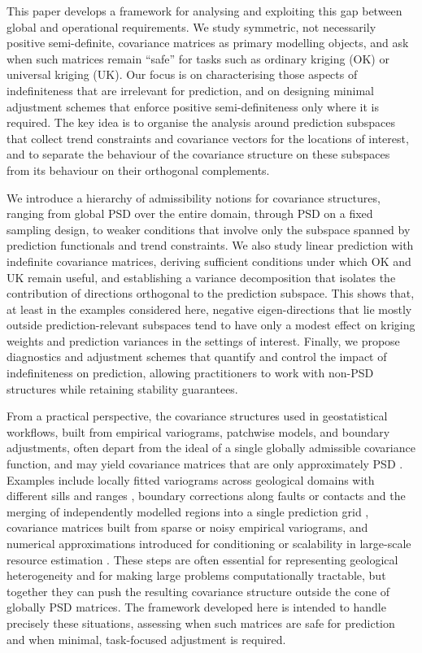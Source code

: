 \documentclass[smallextended]{svjour3}
\newcommand{\1}{\mathbf{1}}
\begin{document}
This paper develops a framework for analysing and exploiting this gap between global and operational requirements. We study symmetric, not necessarily positive semi-definite, covariance matrices as primary modelling objects, and ask when such matrices remain ``safe'' for tasks such as ordinary kriging (OK) or universal kriging (UK). Our focus is on characterising those aspects of indefiniteness that are irrelevant for prediction, and on designing minimal adjustment schemes that enforce positive semi-definiteness only where it is required. The key idea is to organise the analysis around prediction subspaces that collect trend constraints and covariance vectors for the locations of interest, and to separate the behaviour of the covariance structure on these subspaces from its behaviour on their orthogonal complements.

We introduce a hierarchy of admissibility notions for covariance structures, ranging from global PSD over the entire domain, through PSD on a fixed sampling design, to weaker conditions that involve only the subspace spanned by prediction functionals and trend constraints. We also study linear prediction with indefinite covariance matrices, deriving sufficient conditions under which OK and UK remain useful, and establishing a variance decomposition that isolates the contribution of directions orthogonal to the prediction subspace. This shows that, at least in the examples considered here, negative eigen-directions that lie mostly outside prediction-relevant subspaces tend to have only a modest effect on kriging weights and prediction variances in the settings of interest. Finally, we propose diagnostics and adjustment schemes that quantify and control the impact of indefiniteness on prediction, allowing practitioners to work with non-PSD structures while retaining stability guarantees.

From a practical perspective, the covariance structures used in geostatistical workflows, built from empirical variograms, patchwise models, and boundary adjustments, often depart from the ideal of a single globally admissible covariance function, and may yield covariance matrices that are only approximately PSD \citep[e.g.][]{chilesdelfiner2012}. Examples include locally fitted variograms across geological domains with different sills and ranges \citep{Olea1999}, boundary corrections along faults or contacts and the merging of independently modelled regions into a single prediction grid \citep{armstrong1998}, covariance matrices built from sparse or noisy empirical variograms, and numerical approximations introduced for conditioning or scalability in large-scale resource estimation \citep[see, e.g.,][]{chilesdelfiner2012,goovaerts1997,chilesdelfiner2012}.  These steps are often essential for representing geological heterogeneity and for making large problems computationally tractable, but together they can push the resulting covariance structure outside the cone of globally PSD matrices. The framework developed here is intended to handle precisely these situations, assessing when such matrices are safe for prediction and when minimal, task-focused adjustment is required.
\end{document}
